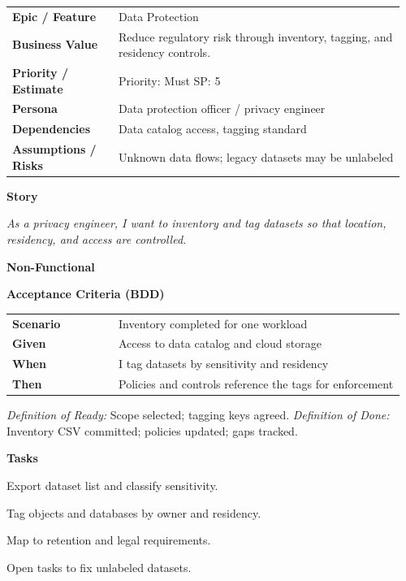 \documentclass[11pt,letterpaper]{article}
\makeatletter
\newenvironment{kvtable}{%
  \par\noindent\begin{tabular}{@{}>{\raggedright\bfseries\arraybackslash}p{0.26\linewidth} >{\raggedright\arraybackslash}p{0.70\linewidth}@{}}
}{\end{tabular}\par}
\newenvironment{bdd}{%
  \par\noindent\begin{tabular}{@{}>{\raggedright\bfseries\arraybackslash}p{0.26\linewidth} >{\raggedright\arraybackslash}p{0.70\linewidth}@{}}
}{\end{tabular}\par}
\newcommand{\DoRDoD}[2]{%
  \vspace{0.35em}
  {\footnotesize\color{Muted}%
    \textit{Definition of Ready:} #1 \; \textbullet\;
    \textit{Definition of Done:} #2%
  }%
}
\newenvironment{storycard}[2]{%
  \begin{tcolorbox}[cloudcard, title={#1 --- #2}]%
}{\end{tcolorbox}}
\newcommand{\sectionlabel}[1]{\par\vspace{0.35em}\textbf{#1}\par}
\makeatother
\begin{document}
\begin{storycard}{CCS-4}{Ch. 4 — Privacy \& Trust Baselines}
\begin{kvtable}
Epic / Feature & Data Protection\\
Business Value & Reduce regulatory risk through inventory, tagging, and residency controls.\\
Priority / Estimate & Priority: Must \quad SP: 5\\
Persona & Data protection officer / privacy engineer\\
Dependencies & Data catalog access, tagging standard\\
Assumptions / Risks & Unknown data flows; legacy datasets may be unlabeled\\
\end{kvtable}
\sectionlabel{Story}
\textit{As a privacy engineer, I want to inventory and tag datasets so that location, residency, and access are controlled.}
\sectionlabel{Non-Functional}\;\;
\sectionlabel{Acceptance Criteria (BDD)}
\begin{bdd}
Scenario & Inventory completed for one workload\\
Given & Access to data catalog and cloud storage\\
When & I tag datasets by sensitivity and residency\\
Then & Policies and controls reference the tags for enforcement\\
\end{bdd}
\DoRDoD{Scope selected; tagging keys agreed.}{Inventory CSV committed; policies updated; gaps tracked.}
\sectionlabel{Tasks}
\begin{checklist}
\item Export dataset list and classify sensitivity.
\item Tag objects and databases by owner and residency.
\item Map to retention and legal requirements.
\item Open tasks to fix unlabeled datasets.
\end{checklist}
\end{storycard}
\end{document}
